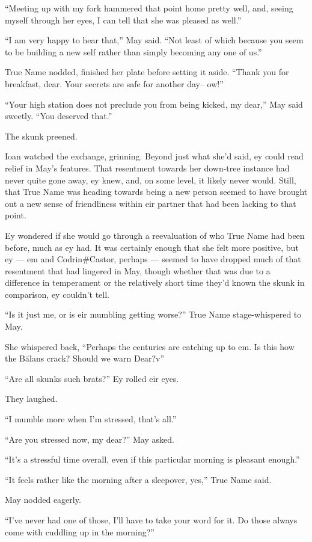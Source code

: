 ``Meeting up with my fork hammered that point home pretty well, and, seeing myself through her eyes, I can tell that she was pleased as well.''

``I am very happy to hear that,'' May said. ``Not least of which because you seem to be building a new self rather than simply becoming any one of us.''

True Name nodded, finished her plate before setting it aside. ``Thank you for breakfast, dear. Your secrets are safe for another day-- ow!''

``Your high station does not preclude you from being kicked, my dear,'' May said sweetly. ``You deserved that.''

The skunk preened.

Ioan watched the exchange, grinning. Beyond just what she'd said, ey could read relief in May's features. That resentment towards her down-tree instance had never quite gone away, ey knew, and, on some level, it likely never would. Still, that True Name was heading towards being a new person seemed to have brought out a new sense of friendliness within eir partner that had been lacking to that point.

Ey wondered if she would go through a reevaluation of who True Name had been before, much as ey had. It was certainly enough that she felt more positive, but ey — em and Codrin\#Castor, perhaps — seemed to have dropped much of that resentment that had lingered in May, though whether that was due to a difference in temperament or the relatively short time they'd known the skunk in comparison, ey couldn't tell.

``Is it just me, or is eir mumbling getting worse?'' True Name stage-whispered to May.

She whispered back, ``Perhaps the centuries are catching up to em. Is this how the Bălans crack? Should we warn Dear?v''

``Are all skunks such brats?'' Ey rolled eir eyes.

They laughed.

``I mumble more when I'm stressed, that's all.''

``Are you stressed now, my dear?'' May asked.

``It's a stressful time overall, even if this particular morning is pleasant enough.''

``It feels rather like the morning after a sleepover, yes,'' True Name said.

May nodded eagerly.

``I've never had one of those, I'll have to take your word for it. Do those always come with cuddling up in the morning?''


